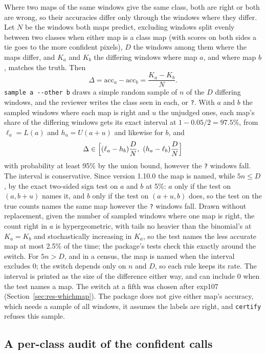 \documentclass[11pt,a4paper]{article}
\newcommand{\code}[1]{\texttt{#1}}
\begin{document}
Where two maps of the same windows give the same class, both are right or both are wrong, so their accuracies differ
only through the windows where they differ. Let $N$ be the windows both maps predict, excluding windows split evenly
between two classes when either map is a class map (with scores on both sides a tie goes to the more confident
pixels), $D$ the windows among them where the maps differ, and $K_a$ and $K_b$ the differing windows where
map $a$, and where map $b$, matches the truth. Then
\begin{equation}
  \Delta = \mathrm{acc}_a - \mathrm{acc}_b = \frac{K_a - K_b}{N}.
\end{equation}
\code{sample a -{}-other b} draws a simple random sample of $n$ of the $D$ differing windows, and the reviewer writes the
class seen in each, or \code{?}. With $a$ and $b$ the sampled windows where each map is right and $u$ the unjudged ones,
each map's share of the differing windows gets its exact interval at $1 - 0.05/2 = 97.5\%$, from
$\ell_a = L(a)$ and $h_a = U(a+u)$ and likewise for $b$, and
\begin{equation}
  \Delta \in \Bigl[(\ell_a - h_b)\frac{D}{N},\ (h_a - \ell_b)\frac{D}{N}\Bigr]
\end{equation}
with probability at least 95\% by the union bound, however the \code{?} windows fall. The interval is conservative.
Since version 1.10.0 the map is named, while $5n \le D$, by the exact two-sided sign test on $a$ and $b$ at 5\%: $a$
only if the test on $(a, b+u)$ names it, and $b$ only if the test on $(a+u, b)$ does, so the test on the true counts
names the same map however the \code{?} windows fall. Drawn without replacement, given the number of sampled windows
where one map is right, the count right in $a$ is hypergeometric, with tails no heavier than the binomial's at
$K_a = K_b$ and stochastically increasing in $K_a$, so the test names the less accurate map at most 2.5\% of the time; the package's tests check this exactly
around the switch. For $5n > D$, and in a census, the map is named when the interval excludes 0; the switch depends only
on $n$ and $D$, so each rule keeps its rate. The interval is printed as the size of the difference either way, and can
include 0 when the test names a map. The switch at a fifth was chosen after exp107
(Section~\ref{sec:res-whichmap}). The package does not give either map's accuracy, which needs a sample of all windows,
it assumes the labels are right, and \code{certify} refuses this sample.

\subsection{A per-class audit of the confident calls}
\label{sec:audit}
\end{document}
